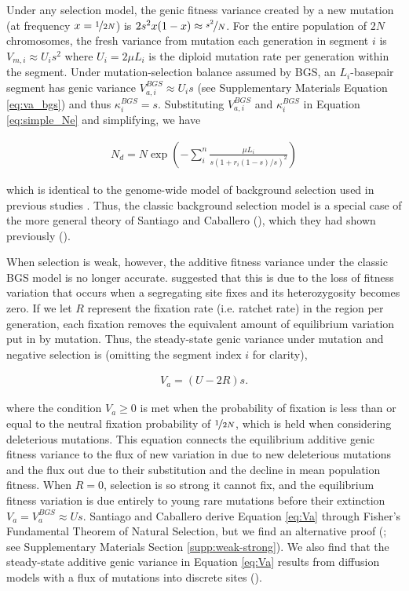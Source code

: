 \documentclass[11pt]{article}
\begin{document}
Under any selection model, the genic fitness variance created by a new mutation
(at frequency $x=\nicefrac{1}{2N}$) is $2s^2 x(1-x) \approx \nicefrac{s^2}{N}$.
For the entire population of $2N$ chromosomes, the fresh variance from mutation
each generation in segment $i$ is $V_{m,i} \approx U_is^2$ where $U_i = 2\mu
L_i$ is the diploid mutation rate per generation within the segment. Under
mutation-selection balance assumed by BGS, an $L_i$-basepair segment has genic
variance $V_{a,i}^{BGS} \approx U_i s$ (see Supplementary Materials Equation
\ref{eq:va_bgs}) and thus $\kappa_i^{BGS} = s$. Substituting $V_{a,i}^{BGS}$
and $\kappa_i^{BGS}$ in Equation \eqref{eq:simple_Ne} and simplifying, we have

\begin{align}
    N_d = N \exp \left( - \sum_i^n \frac{\mu L_i}{s(1 + r_i(1-s)/s)^2} \right) 
\end{align}

which is identical to the genome-wide model of background selection used in
previous studies \parencite{McVicker2009-ax,Elyashiv2016-vt,Murphy2022-sj}.
Thus, the classic background selection model is a special case of the more
general theory of Santiago and Caballero (\citeyear{Santiago2016-mu}), which
they had shown previously (\citeyear{Santiago1998-bs}).

When selection is weak, however, the additive fitness variance under the
classic BGS model is no longer accurate. \textcite{Santiago2016-mu} suggested
that this is due to the loss of fitness variation that occurs when a
segregating site fixes and its heterozygosity becomes zero. If we let $R$
represent the fixation rate (i.e. ratchet rate) in the region per generation,
each fixation removes the equivalent amount of equilibrium variation put in by
mutation. Thus, the steady-state genic variance under mutation and negative
selection is (omitting the segment index $i$ for clarity),

\begin{align}
  \label{eq:Va}
  V_{a} = (U - 2 R)s. 
\end{align}

where the condition $V_a \ge 0$ is met when the probability of fixation is less
than or equal to the neutral fixation probability of $\nicefrac{1}{2N}$, which
is held when considering deleterious mutations. This equation connects the
equilibrium additive genic fitness variance to the flux of new variation in due
to new deleterious mutations and the flux out due to their substitution and the
decline in mean population fitness. When $R=0$, selection is so strong it
cannot fix, and the equilibrium fitness variation is due entirely to young rare
mutations before their extinction $V_a = V_a^{BGS} \approx Us$. Santiago and
Caballero derive Equation \eqref{eq:Va} through Fisher's Fundamental Theorem of
Natural Selection, but we find an alternative proof (\cite{Higgs1995-xc}; see
Supplementary Materials Section \ref{supp:weak-strong}). We also find that the
steady-state additive genic variance in Equation \eqref{eq:Va} results from
diffusion models with a flux of mutations into discrete sites
(\cite{Kimura1969-jw}). 
\end{document}
